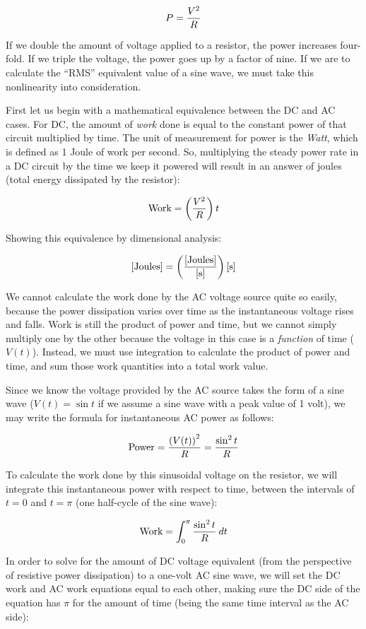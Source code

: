 $$P = {V^2 \over R}$$

If we double the amount of voltage applied to a resistor, the power increases four-fold.  If we triple the voltage, the power goes up by a factor of nine.  If we are to calculate the ``RMS'' equivalent value of a sine wave, we must take this nonlinearity into consideration.

\filbreak

First let us begin with a mathematical equivalence between the DC and AC cases.  For DC, the amount of \textit{work} done is equal to the constant power of that circuit multiplied by time.  The unit of measurement for power is the \textit{Watt}, which is defined as 1 Joule of work per second.  So, multiplying the steady power rate in a DC circuit by the time we keep it powered will result in an answer of joules (total energy dissipated by the resistor):

$$\hbox{Work} = \left({V^2 \over R} \right)t$$

Showing this equivalence by dimensional analysis:

$$[\hbox{Joules}] = \left([\hbox{Joules}] \over [\hbox{s}]\right) [\hbox{s}]$$

We cannot calculate the work done by the AC voltage source quite so easily, because the power dissipation varies over time as the instantaneous voltage rises and falls.  Work is still the product of power and time, but we cannot simply multiply one by the other because the voltage in this case is a \textit{function} of time ($V(t)$).  Instead, we must use integration to calculate the product of power and time, and sum those work quantities into a total work value.  

Since we know the voltage provided by the AC source takes the form of a sine wave ($V(t) = \sin t$ if we assume a sine wave with a peak value of 1 volt), we may write the formula for instantaneous AC power as follows:

$$\hbox{Power} = {\left(V(t)\right)^2 \over R} = {\sin^2 t \over R}$$

To calculate the work done by this sinusoidal voltage on the resistor, we will integrate this instantaneous power with respect to time, between the intervals of $t=0$ and $t=\pi$ (one half-cycle of the sine wave):  

$$\hbox{Work} = \int_0^\pi {{\sin^2 t} \over R} \> dt$$

In order to solve for the amount of DC voltage equivalent (from the perspective of resistive power dissipation) to a one-volt AC sine wave, we will set the DC work and AC work equations equal to each other, making sure the DC side of the equation has $\pi$ for the amount of time (being the same time interval as the AC side):

